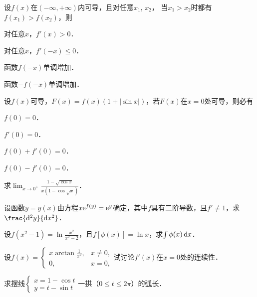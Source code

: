 \documentclass[plain,noanswer,medmath]{../../template/jnuexam}
\begin{document}
\begin{problem}
设$f(x)$在$(-\infty , +\infty)$内可导，且对任意$x_1$, $x_2$，
当$x_1 > x_2$时都有$f(x_1) > f(x_2)$，则\pickout{}
\begin{abcd}
\item 对任意$x$，$f'(x) > 0$．		
\item 对任意$x$，$f'(- x) \le 0$．
\item 函数$f(- x)$单调增加．
\item 函数$- f(- x)$单调增加．
\end{abcd}
\end{problem}




\begin{problem}
设$f(x)$可导，$F(x) = f(x)(1 + |\sin x|)$，若$F(x)$在$x = 0$处可导，则必有\pickout{}
\begin{abcd}
\item $f(0) = 0$．							
\item $f'(0) = 0$．
\item $f(0) + f'(0) = 0$．					
\item $f(0) - f'(0) = 0$．
\end{abcd}
\end{problem}




\begin{problem}
求$\lim_{x \to 0^+} \frac{1 - \sqrt{\cos x}}{x(1 - \cos \sqrt{x})}$．
\end{problem}


\begin{problem}
设函数$y = y(x)$由方程$x\mathrm{e}^{f(y)} = \mathrm{e}^y$确定，其中$f$具有二阶导数，且$f' \ne 1$，求$\frac{\d^2 y}{\dx^2}$．
\end{problem}


\begin{problem}
设$f(x^2 - 1) = \ln \frac{x^2}{x^2 - 2}$，且$f[\phi(x)] = \ln x$，求$\int \phi(x)\mathop{}\!\mathrm{d} x$．
\end{problem}


\begin{problem}
设$f(x) = \begin{cases}
  x\arctan\frac{1}{x^2}, & x \ne 0, \\
 0, & x = 0,
\end{cases}$试讨论$f'(x)$在$x = 0$处的连续性．
\end{problem}


\begin{problem}
求摆线$\begin{cases}
  x = 1 - \cos t \\
  y = t - \sin t
\end{cases}$一拱（$0 \le t \le 2\pi$）的弧长．
\end{problem}
\end{document}
